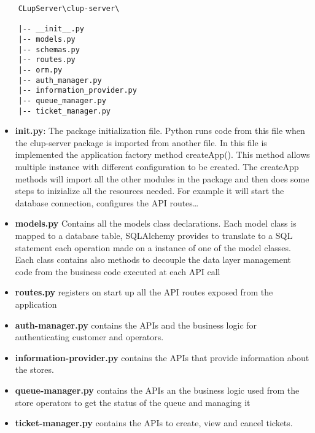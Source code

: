 \begin{lstlisting}
    CLupServer\clup-server\

    |-- __init__.py
    |-- models.py
    |-- schemas.py
    |-- routes.py
    |-- orm.py
    |-- auth_manager.py
    |-- information_provider.py
    |-- queue_manager.py
    |-- ticket_manager.py

\end{lstlisting}

\begin{itemize}
    \item \textbf{init.py}: The package initialization file. Python runs code from this file when the clup-server package is imported from another file. In this file is implemented the application factory method createApp(). This method allows multiple instance with different configuration to be created. The createApp methods will import all the other modules in the package and then does some steps to inizialize all the resources needed. For example it will start the database connection, configures the API routes\ldots
    \item \textbf{models.py} Contains all the models class declarations. Each model class is mapped to a database table, SQLAlchemy provides to translate to a SQL statement each operation made on a instance of one of the model classes. Each class contains also methods to decouple the data layer management code from the business code executed at each API call 
    \item \textbf{routes.py} registers on start up all the API routes exposed from the application
    \item \textbf{auth-manager.py} contains the APIs and the business logic for authenticating customer and operators.
    \item \textbf{information-provider.py} contains the APIs that provide information about the stores.
    \item \textbf{queue-manager.py} contains the APIs an the business logic used from the store operators to get the status of the queue and managing it 
    \item \textbf{ticket-manager.py} contains the APIs to create, view and cancel tickets.
\end{itemize}
